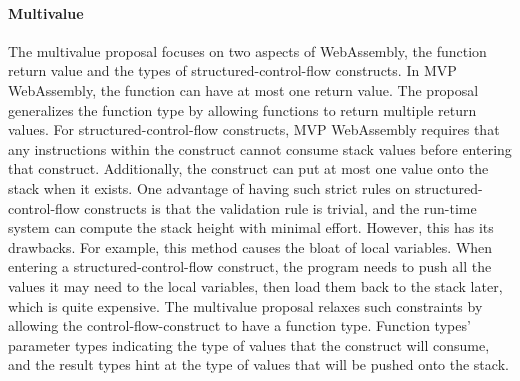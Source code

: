 \paragraph{Multivalue}
The multivalue proposal focuses on two aspects of WebAssembly, the function return value and the types of structured-control-flow constructs. In MVP WebAssembly, the function can have at most one return value. The proposal generalizes the function type by allowing functions to return multiple return values. For structured-control-flow constructs, MVP WebAssembly requires that any instructions within the construct cannot consume stack values before entering that construct. Additionally, the construct can put at most one value onto the stack when it exists. One advantage of having such strict rules on structured-control-flow constructs is that the validation rule is trivial, and the run-time system can compute the stack height with minimal effort. However, this has its drawbacks. For example, this method causes the bloat of local variables. When entering a structured-control-flow construct, the program needs to push all the values it may need to the local variables, then load them back to the stack later, which is quite expensive. The multivalue proposal relaxes such constraints by allowing the control-flow-construct to have a function type. Function types' parameter types indicating the type of values that the construct will consume, and the result types hint at the type of values that will be pushed onto the stack.

